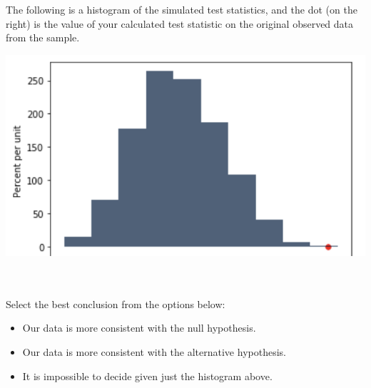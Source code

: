 \begin{enumerate}
The following is a histogram of the simulated test statistics, and the dot (on the right) is the value of your calculated test statistic on the original observed data from the sample.
\\
\begin{center}
\includegraphics[scale=0.5]{statistics.png}
\end{center}\\
\\ 
 Select the best conclusion from the options below: 
\begin{itemize}[label=\bubble]
\item Our data is more consistent with the null hypothesis.
\item Our data is more consistent with the alternative hypothesis.
\item It is impossible to decide given just the histogram above.
\end{itemize}
\end{enumerate}



